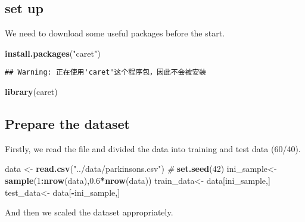 \documentclass[
]{article}
\newenvironment{Shaded}{\begin{snugshade}}{\end{snugshade}}
\newcommand{\CommentTok}[1]{\textcolor[rgb]{0.56,0.35,0.01}{\textit{#1}}}
\newcommand{\DecValTok}[1]{\textcolor[rgb]{0.00,0.00,0.81}{#1}}
\newcommand{\FloatTok}[1]{\textcolor[rgb]{0.00,0.00,0.81}{#1}}
\newcommand{\FunctionTok}[1]{\textcolor[rgb]{0.13,0.29,0.53}{\textbf{#1}}}
\newcommand{\NormalTok}[1]{#1}
\newcommand{\OtherTok}[1]{\textcolor[rgb]{0.56,0.35,0.01}{#1}}
\newcommand{\SpecialCharTok}[1]{\textcolor[rgb]{0.81,0.36,0.00}{\textbf{#1}}}
\newcommand{\StringTok}[1]{\textcolor[rgb]{0.31,0.60,0.02}{#1}}
\begin{document}
\subsection{set up}\label{set-up}

We need to download some useful packages before the start.

\begin{Shaded}
\begin{Highlighting}[]
\FunctionTok{install.packages}\NormalTok{(}\StringTok{"caret"}\NormalTok{)}
\end{Highlighting}
\end{Shaded}

\begin{verbatim}
## Warning: 正在使用'caret'这个程序包，因此不会被安装
\end{verbatim}

\begin{Shaded}
\begin{Highlighting}[]
\FunctionTok{library}\NormalTok{(caret)}
\end{Highlighting}
\end{Shaded}

\subsection{Prepare the dataset}\label{prepare-the-dataset}

Firstly, we read the file and divided the data into training and test
data (60/40).

\begin{Shaded}
\begin{Highlighting}[]
\NormalTok{data }\OtherTok{\textless{}{-}} \FunctionTok{read.csv}\NormalTok{(}\StringTok{"../data/parkinsons.csv"}\NormalTok{) }\CommentTok{\#}
\FunctionTok{set.seed}\NormalTok{(}\DecValTok{42}\NormalTok{)}
\NormalTok{ini\_sample}\OtherTok{\textless{}{-}} \FunctionTok{sample}\NormalTok{(}\DecValTok{1}\SpecialCharTok{:}\FunctionTok{nrow}\NormalTok{(data),}\FloatTok{0.6}\SpecialCharTok{*}\FunctionTok{nrow}\NormalTok{(data))}
\NormalTok{train\_data}\OtherTok{\textless{}{-}}\NormalTok{ data[ini\_sample,]}
\NormalTok{test\_data}\OtherTok{\textless{}{-}}\NormalTok{ data[}\SpecialCharTok{{-}}\NormalTok{ini\_sample,]}
\end{Highlighting}
\end{Shaded}

And then we scaled the dataset appropriately.
\end{document}
